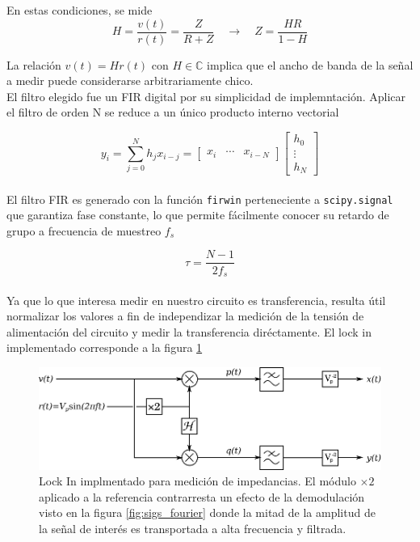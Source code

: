 \documentclass[11pt,a4paper]{extarticle}
\begin{document}
\begin{multicols}{2}
En estas condiciones, se mide 
\begin{equation}
	H = \frac{v(t)}{r(t)} = \frac{Z}{R + Z} \quad \longrightarrow \quad Z =  \frac{HR}{1-H}	
\end{equation}

La relación $v(t) = H r(t)$ con $H \in \mathbb C$ implica que el ancho de banda de la señal a medir puede considerarse arbitrariamente chico.\\

El filtro elegido fue un FIR digital por su simplicidad de implemntación. Aplicar el filtro de orden N se reduce a un único producto interno vectorial

\begin{equation}\label{eq:fir}
	y_i = \sum_{j=0}^N h_jx_{i-j}= 
	\begin{bmatrix}
		x_i & \cdots & x_{i-N}
	\end{bmatrix}
	\begin{bmatrix}
		h_0 \\ \vdots \\ h_N	
	\end{bmatrix}
\end{equation}\\[-1em]

El filtro FIR es generado con la función \texttt{firwin} perteneciente a \texttt{scipy.signal} que garantiza fase constante, lo que permite fácilmente conocer su retardo de grupo a frecuencia de muestreo $f_s$

\begin{equation}\label{eq:tau}
	\tau = \frac{N-1}{2f_s}
\end{equation}\\[-1em]

Ya que lo que interesa medir en nuestro circuito es transferencia, resulta útil normalizar los valores a fin de independizar la medición de la tensión de alimentación del circuito y medir la transferencia diréctamente. El lock in implementado corresponde a la figura \ref{fig:nuestro_lockin}

\begin{figure}[H]
	\centering
	\includegraphics[width=\linewidth]{Images/nuestro_lockin.eps}
	\caption{Lock In implmentado para medición de impedancias. El módulo $\times 2$ aplicado a la referencia contrarresta un efecto de la demodulación visto en la figura \ref{fig:sigs_fourier} donde la mitad de la amplitud de la señal de interés es transportada a alta frecuencia y filtrada.}
	\label{fig:nuestro_lockin}
\end{figure}


\end{multicols}
\end{document}
